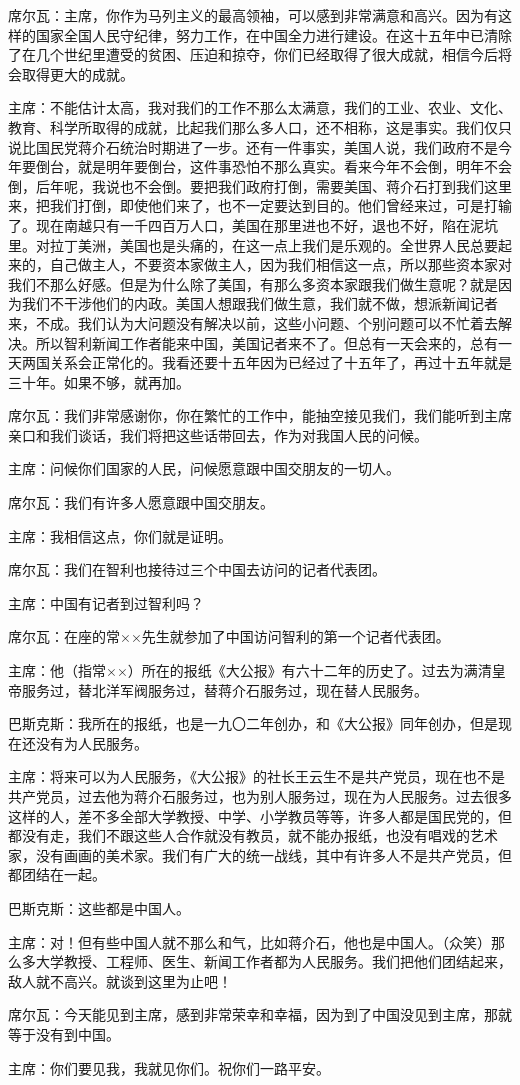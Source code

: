 席尔瓦：主席，你作为马列主义的最高领袖，可以感到非常满意和高兴。因为有这样的国家全国人民守纪律，努力工作，在中国全力进行建设。在这十五年中已清除了在几个世纪里遭受的贫困、压迫和掠夺，你们已经取得了很大成就，相信今后将会取得更大的成就。

主席：不能估计太高，我对我们的工作不那么太满意，我们的工业、农业、文化、教育、科学所取得的成就，比起我们那么多人口，还不相称，这是事实。我们仅只说比国民党蒋介石统治时期进了一步。还有一件事实，美国人说，我们政府不是今年要倒台，就是明年要倒台，这件事恐怕不那么真实。看来今年不会倒，明年不会倒，后年呢，我说也不会倒。要把我们政府打倒，需要美国、蒋介石打到我们这里来，把我们打倒，即使他们来了，也不一定要达到目的。他们曾经来过，可是打输了。现在南越只有一千四百万人口，美国在那里进也不好，退也不好，陷在泥坑里。对拉丁美洲，美国也是头痛的，在这一点上我们是乐观的。全世界人民总要起来的，自己做主人，不要资本家做主人，因为我们相信这一点，所以那些资本家对我们不那么好感。但是为什么除了美国，有那么多资本家跟我们做生意呢？就是因为我们不干涉他们的内政。美国人想跟我们做生意，我们就不做，想派新闻记者来，不成。我们认为大问题没有解决以前，这些小问题、个别问题可以不忙着去解决。所以智利新闻工作者能来中国，美国记者来不了。但总有一天会来的，总有一天两国关系会正常化的。我看还要十五年因为已经过了十五年了，再过十五年就是三十年。如果不够，就再加。

席尔瓦：我们非常感谢你，你在繁忙的工作中，能抽空接见我们，我们能听到主席亲口和我们谈话，我们将把这些话带回去，作为对我国人民的问候。

主席：问候你们国家的人民，问候愿意跟中国交朋友的一切人。

席尔瓦：我们有许多人愿意跟中国交朋友。

主席：我相信这点，你们就是证明。

席尔瓦：我们在智利也接待过三个中国去访问的记者代表团。

主席：中国有记者到过智利吗？

席尔瓦：在座的常××先生就参加了中国访问智利的第一个记者代表团。

主席：他（指常××）所在的报纸《大公报》有六十二年的历史了。过去为满清皇帝服务过，替北洋军阀服务过，替蒋介石服务过，现在替人民服务。

巴斯克斯：我所在的报纸，也是一九〇二年创办，和《大公报》同年创办，但是现在还没有为人民服务。

主席：将来可以为人民服务，《大公报》的社长王云生不是共产党员，现在也不是共产党员，过去他为蒋介石服务过，也为别人服务过，现在为人民服务。过去很多这样的人，差不多全部大学教授、中学、小学教员等等，许多人都是国民党的，但都没有走，我们不跟这些人合作就没有教员，就不能办报纸，也没有唱戏的艺术家，没有画画的美术家。我们有广大的统一战线，其中有许多人不是共产党员，但都团结在一起。

巴斯克斯：这些都是中国人。

主席：对！但有些中国人就不那么和气，比如蒋介石，他也是中国人。（众笑）那么多大学教授、工程师、医生、新闻工作者都为人民服务。我们把他们团结起来，敌人就不高兴。就谈到这里为止吧！

席尔瓦：今天能见到主席，感到非常荣幸和幸福，因为到了中国没见到主席，那就等于没有到中国。

主席：你们要见我，我就见你们。祝你们一路平安。


